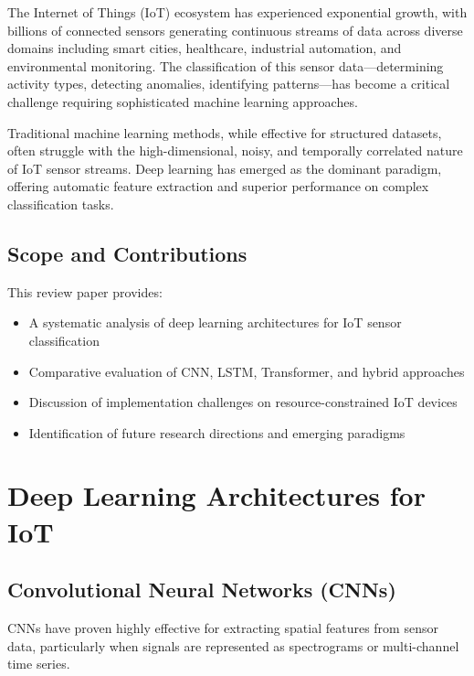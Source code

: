 \documentclass[12pt,a4paper]{article}
\begin{document}
The Internet of Things (IoT) ecosystem has experienced exponential growth, with billions of connected sensors generating continuous streams of data across diverse domains including smart cities, healthcare, industrial automation, and environmental monitoring. The classification of this sensor data—determining activity types, detecting anomalies, identifying patterns—has become a critical challenge requiring sophisticated machine learning approaches.

Traditional machine learning methods, while effective for structured datasets, often struggle with the high-dimensional, noisy, and temporally correlated nature of IoT sensor streams. Deep learning has emerged as the dominant paradigm, offering automatic feature extraction and superior performance on complex classification tasks.

\subsection{Scope and Contributions}

This review paper provides:
\begin{itemize}[leftmargin=*]
    \item A systematic analysis of deep learning architectures for IoT sensor classification
    \item Comparative evaluation of CNN, LSTM, Transformer, and hybrid approaches
    \item Discussion of implementation challenges on resource-constrained IoT devices
    \item Identification of future research directions and emerging paradigms
\end{itemize}

\section{Deep Learning Architectures for IoT}

\subsection{Convolutional Neural Networks (CNNs)}

CNNs have proven highly effective for extracting spatial features from sensor data, particularly when signals are represented as spectrograms or multi-channel time series.
\end{document}
